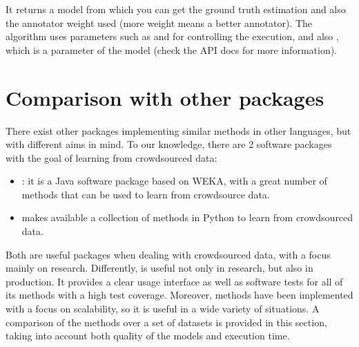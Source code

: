 \documentclass[letterpaper,10pt,english]{sphinxmanual}
\begin{document}
It returns a model from which you can get the ground truth estimation and
also the annotator weight used (more weight means a better annotator).
The algorithm uses parameters such as  and  for
controlling the execution, and also , which is a parameter of the model
(check the API docs for more information).


\chapter{Comparison with other packages}
\label{\detokenize{package/other:comparison-with-other-packages}}\label{\detokenize{package/other:comparison}}\label{\detokenize{package/other::doc}}
There exist other packages implementing similar methods in other languages, but with
different aims in mind. To our knowledge, there are 2 software packages with the goal
of learning from crowdsourced data:
\begin{itemize}
\item {} 
: it is a Java software package based on WEKA, with
a great number of methods that can be used to learn from crowdsource data.

\item {} 
 makes available a collection
of methods in Python to learn from crowdsourced data.

\end{itemize}

Both are useful packages when dealing with crowdsourced data, with a focus mainly on research. Differently,  is 
useful not only in research, but also in production. It provides a clear usage interface as well as software tests for all of its methods with a high test 
coverage. Moreover, methods have been implemented with a focus on scalability, so it is useful in a wide variety of situations. A
comparison of the methods over a set of datasets is provided in this section, taking into account both quality of the models and execution time.
\end{document}
